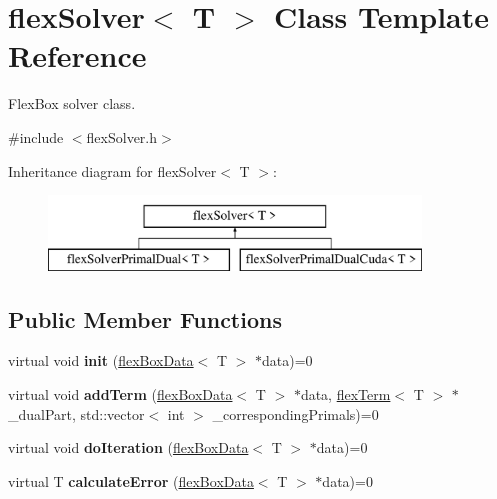 \hypertarget{classflex_solver}{}\section{flex\+Solver$<$ T $>$ Class Template Reference}
\label{classflex_solver}


Flex\+Box solver class.  




{\ttfamily \#include $<$flex\+Solver.\+h$>$}

Inheritance diagram for flex\+Solver$<$ T $>$\+:\begin{figure}[H]
\begin{center}
\leavevmode
\includegraphics[height=2.000000cm]{classflex_solver}
\end{center}
\end{figure}
\subsection*{Public Member Functions}
\begin{DoxyCompactItemize}
\item 
\mbox{\label{classflex_solver_a072d7af0f075d53b2efb6a119fbc6280}} 
virtual void {\bfseries init} (\hyperlink{classflex_box_data}{flex\+Box\+Data}$<$ T $>$ $\ast$data)=0
\item 
\mbox{\label{classflex_solver_ad496971c4d875162b0ce7c675232956e}} 
virtual void {\bfseries add\+Term} (\hyperlink{classflex_box_data}{flex\+Box\+Data}$<$ T $>$ $\ast$data, \hyperlink{classflex_term}{flex\+Term}$<$ T $>$ $\ast$\+\_\+dual\+Part, std\+::vector$<$ int $>$ \+\_\+corresponding\+Primals)=0
\item 
\mbox{\label{classflex_solver_a61ba0cf7b87a326c5360b334b5e48f25}} 
virtual void {\bfseries do\+Iteration} (\hyperlink{classflex_box_data}{flex\+Box\+Data}$<$ T $>$ $\ast$data)=0
\item 
\mbox{\label{classflex_solver_a0ba40198cc0c2f46c81c1981a505f7e9}} 
virtual T {\bfseries calculate\+Error} (\hyperlink{classflex_box_data}{flex\+Box\+Data}$<$ T $>$ $\ast$data)=0
\end{DoxyCompactItemize}


